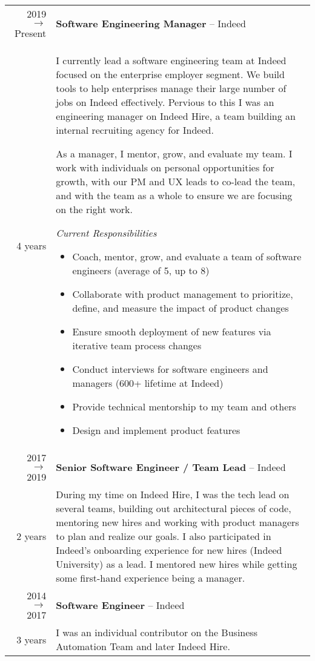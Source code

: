 \documentclass[11pt]{amsart}
\begin{document}
\begin{tabularx}{\textwidth}{@{}r | X@{}}
2019 $\rightarrow$ Present &  \textbf{Software Engineering Manager} – Indeed  \\
\small{4 years}  & I currently lead a software engineering team at Indeed focused on the enterprise employer segment. We build tools to help enterprises manage their large number of jobs on Indeed effectively. Pervious to this I was an engineering manager on Indeed Hire, a team building an internal recruiting agency for Indeed.

\bigskip
As a manager, I mentor, grow, and evaluate my team. I work with individuals on personal opportunities for growth, with our PM and UX leads to co-lead the team, and with the team as a whole to ensure we are focusing on the right work. 

\bigskip
\textit{Current Responsibilities}

\begin{itemize}[noitemsep, leftmargin=2em, label=\raisebox{0.25ex}{\tiny$\bullet$}]
\item Coach, mentor, grow, and evaluate a team of software engineers (average of 5, up to 8)
\item Collaborate with product management to prioritize, define, and measure the impact of product changes
\item Ensure smooth deployment of new features via iterative team process changes
\item Conduct interviews for software engineers and managers (600+ lifetime at Indeed)
\item Provide technical mentorship to my team and others
\item Design and implement product features
\end{itemize}

\\
2017 $\rightarrow$  2019 &  \textbf{Senior Software Engineer / Team Lead} – Indeed \\ 
\small{2 years}  & During my time on Indeed Hire, I was the tech lead on several teams, building out architectural pieces of code, mentoring new hires and working with product managers to plan and realize our goals. I also participated in Indeed's onboarding experience for new hires (Indeed University) as a lead. I mentored new hires while getting some first-hand experience being a manager.

 \\
2014 $\rightarrow$  2017  & \textbf{Software Engineer} – Indeed \\ 
\small{3 years}  & I was an individual contributor on the Business Automation Team and later Indeed Hire. \\
\end{tabularx}
\end{document}
